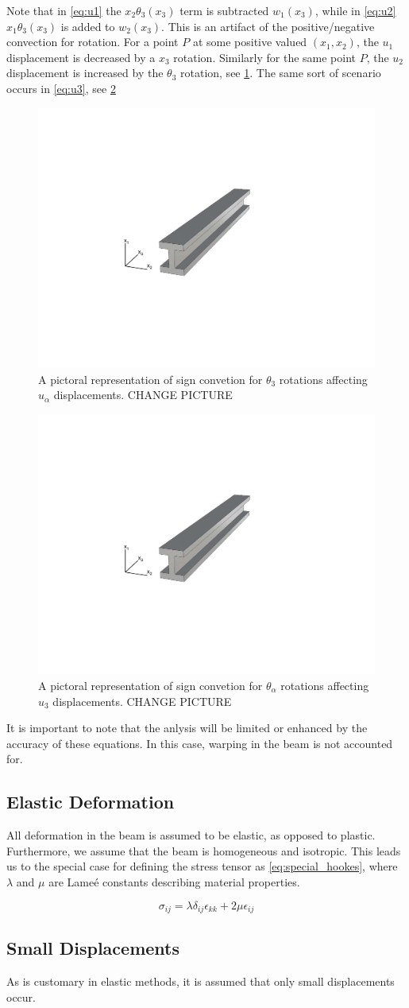 Note that in \cref{eq:u1} the $x_2\theta_3(x_3)$ term is subtracted $w_1(x_3)$, while in \cref{eq:u2} $x_1\theta_3(x_3)$ is added to $w_2(x_3)$.
This is an artifact of the positive/negative convection for rotation.
For a point $P$ at some positive valued $(x_1,x_2)$, the $u_1$ displacement is decreased by a $x_3$ rotation.
Similarly for the same point $P$, the $u_2$ displacement is increased by the $\theta_3$ rotation, see \cref{fig:u1u2_plus_minus_xtheta}.
The same sort of scenario occurs in \cref{eq:u3}, see \cref{fig:u3_plus_minus_xtheta}

\begin{figure}
\centering
\includegraphics[width=0.2\columnwidth,trim=4cm 7cm 6cm 6.5cm, clip]{figs/straight.pdf}
\caption{A pictoral representation of sign convetion for $\theta_3$ rotations affecting $u_\alpha$ displacements. CHANGE PICTURE}
\label{fig:u1u2_plus_minus_xtheta}
\end{figure}

\begin{figure}
\centering
\includegraphics[width=0.2\columnwidth,trim=4cm 7cm 6cm 6.5cm, clip]{figs/straight.pdf}
\caption{A pictoral representation of sign convetion for $\theta_\alpha$ rotations affecting $u_3$ displacements. CHANGE PICTURE}
\label{fig:u3_plus_minus_xtheta}
\end{figure}

It is important to note that the anlysis will be limited or enhanced by the accuracy of these equations.
In this case, warping in the beam is not accounted for.

\subsection{Elastic Deformation}
All deformation in the beam is assumed to be elastic, as opposed to plastic.
Furthermore, we assume that the beam is homogeneous and isotropic.
This leads us to the special case for defining the stress tensor as \cref{eq:special_hookes}, where $\lambda$ and $\mu$ are Lame\'e constants describing material properties.

\begin{equation}
\sigma_{ij}=\lambda\delta_{ij}\epsilon_{kk}+2\mu\epsilon_{ij}
\label{eq:special_hookes}
\end{equation}


\subsection{Small Displacements}
As is customary in elastic methods, it is assumed that only small displacements occur.
